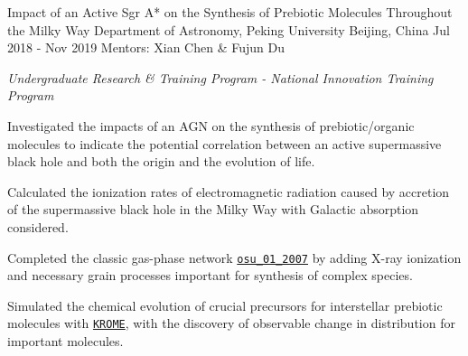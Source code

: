 


\begin{cvexperiences}


\cvexperience
{Impact of an Active Sgr A* on the Synthesis of Prebiotic Molecules Throughout the Milky Way} %
{Department of Astronomy, Peking University} %
{Beijing, China} %
{Jul 2018 - Nov 2019} %
{Mentors: Xian Chen \& Fujun Du}
{ %
\begin{cvitems}
\item {\textit{Undergraduate Research \& Training Program - National Innovation Training Program}}
\item {Investigated the impacts of an AGN on the synthesis of prebiotic/organic molecules to indicate the potential correlation between an active supermassive black hole and both the origin and the evolution of life.}
\item {Calculated the ionization rates of electromagnetic radiation caused by accretion of the supermassive black hole in the Milky Way with Galactic absorption considered.}
\item {Completed the classic gas-phase network \href{http://faculty.virginia.edu/ericherb/research_files/osu_01_2007}{\texttt{osu\_01\_2007}} by adding  X-ray ionization and necessary grain processes important for synthesis of complex species.}
\item {Simulated the chemical evolution of crucial precursors for interstellar prebiotic molecules with \href{http://kromepackage.org}{\texttt{KROME}}, with the discovery of observable change in distribution for important molecules.}
\end{cvitems}
}


\end{cvexperiences}
